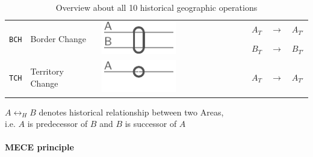 \begin{table}[!h]
\begin{center}
\begin{tabular}{m{0.65cm} m{2.5cm} m{2.2cm}
                m{0.35cm} m{0.35cm} m{0.35cm} m{0.01cm}
                m{0.35cm} m{0.3cm} m{0.35cm} m{0.01cm}
                m{0.35cm} m{0.3cm} m{0.88cm}}
  \midrule[0.01em]
  \multirow{2}{*}{\texttt{BCH}} &
  \multirow{2}{*}{Border Change} &
  \multirow{2}{*}{\includegraphics{graphics/concept/operations/BCH}} &
  & & & &
  & & & &
  $ A_T $ & $ \rightarrow $ & $ A_{T'} $ \\
  & & &
  & & & &
  & & & &
  $ B_T $ & $ \rightarrow $ & $ B_{T'} $ \footnotemark \\

  \midrule[0.01em]
  \multirow{1}{*}{\texttt{TCH}} &
  \multirow{1}{*}{Territory Change} &
  \multirow{1}{*}{\includegraphics{graphics/concept/operations/NCH_TCH}} &
  & & & &
  & & & &
  $ A_T $ & $ \rightarrow $ & $ A_{T'} $ \\

  \bottomrule
\end{tabular}
\caption{Overview about all 10 historical geographic operations}
\small{$A \leftrightarrow_H B$ denotes historical relationship between two Areas, \\ i.e. $A$ is predecessor of $B$ and $B$ is successor of $A$}
\label{tab:historical_geographic_operations}
\end{center}
\end{table}

\addtocounter{footnote}{-4}
\addtocounter{footnote}{1}
\addtocounter{footnote}{1}
\addtocounter{footnote}{1}
\addtocounter{footnote}{1}


\paragraph{MECE principle} %
\label{par:mece_principle}

